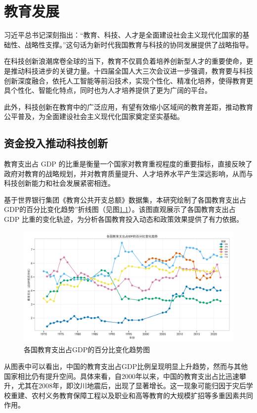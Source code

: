 \chapter{教育发展}
\label{chapter:Education}

习近平总书记深刻指出：“教育、科技、人才是全面建设社会主义现代化国家的基础性、战略性支撑。”这句话为新时代我国教育与科技的协同发展提供了战略指导。

在科技创新浪潮席卷全球的当下，教育不仅肩负着培养创新型人才的重要使命，更是推动科技进步的关键力量。十四届全国人大三次会议进一步强调，教育要与科技创新深度融合，依托人工智能等前沿技术，实现个性化、精准化培养，使得教育更具个性化、智能化特点，同时也为人才培养提供了更为广阔的平台。

此外，科技创新在教育中的广泛应用，有望有效缩小区域间的教育差距，推动教育公平普及，为全面建设社会主义现代化国家奠定坚实基础。


\section{资金投入推动科技创新}

教育支出占 GDP 的比重是衡量一个国家对教育重视程度的重要指标，直接反映了政府对教育的战略规划，并对教育质量提升、人才培养水平产生深远影响，从而与科技创新能力和社会发展紧密相连。

基于世界银行集团《教育公共开支总额》数据集，本研究绘制了各国教育支出占GDP的百分比变化趋势”折线图（见图\ref{01各国教育支出占GDP的百分比变化趋势图}）。该图直观展示了各国教育支出占 GDP 比重的变化轨迹，为分析各国教育投入动态和政策效果提供了有力依据。

\begin{figure}[H]
    \centering
    \includegraphics[width=0.7\linewidth]{figure/01各国教育支出占GDP的百分比变化趋势图.png}
    \caption{各国教育支出占GDP的百分比变化趋势图}
    \label{01各国教育支出占GDP的百分比变化趋势图}
\end{figure}

从图表中可以看出，中国的教育支出占GDP比例呈现明显上升趋势\cite{huang2021education}，然而与其他国家相比仍有提升空间。具体来看，自2000年以来，中国的教育支出占比迅速攀升，尤其在2008年，即汶川地震后，出现了显著增长。这一现象可能归因于灾后学校重建、农村义务教育保障工程以及职业和高等教育的大规模扩招等多重因素共同作用。
